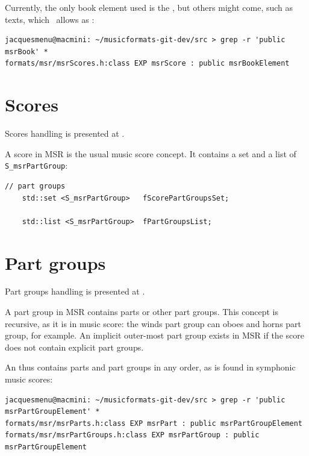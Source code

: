 Currently, the only book element used is the , but others might come, such as texts, which \lily\ allows as :
\begin{lstlisting}[language=Terminal]
jacquesmenu@macmini: ~/musicformats-git-dev/src > grep -r 'public msrBook' *
formats/msr/msrScores.h:class EXP msrScore : public msrBookElement
\end{lstlisting}


\section{Scores}\label{Scores}

Scores handling is presented at .

A score in MSR is the usual music score concept. It contains a set and a list of {\tt S_msrPartGroup}:
\begin{lstlisting}[language=CPlusPlus]
    // part groups
    std::set <S_msrPartGroup>   fScorePartGroupsSet;

    std::list <S_msrPartGroup>  fPartGroupsList;
\end{lstlisting}


\section{Part groups}\label{Part groups}

Part groups handling is presented at .

A part group in MSR contains parts or other part groups. This concept is recursive, as it is in music score: the winds part group can oboes and horns part group, for example.
An implicit outer-most part group exists in MSR if the score does not contain explicit part groups.

An  thus contains parts and part groups in any order, as is found in symphonic music scores:
\begin{lstlisting}[language=Terminal]
jacquesmenu@macmini: ~/musicformats-git-dev/src > grep -r 'public msrPartGroupElement' *
formats/msr/msrParts.h:class EXP msrPart : public msrPartGroupElement
formats/msr/msrPartGroups.h:class EXP msrPartGroup : public msrPartGroupElement
\end{lstlisting}

